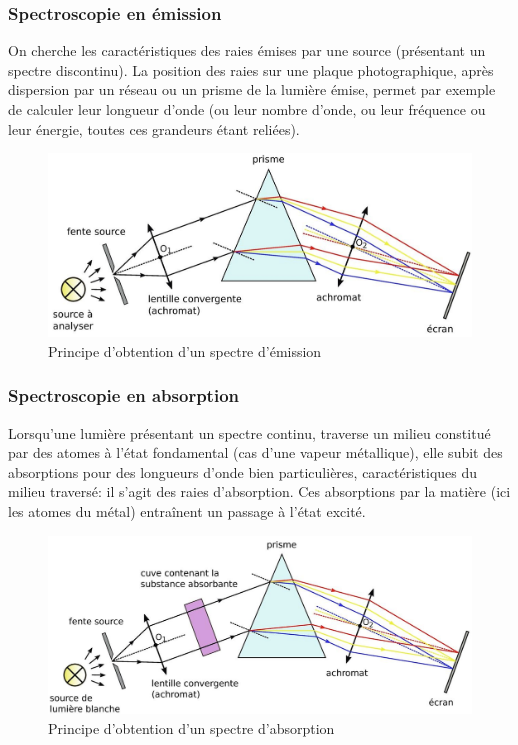 \documentclass{article}
\begin{document}
\subsubsection{Spectroscopie en émission}
On cherche les caractéristiques des raies émises par une source (présentant un spectre discontinu). La position des raies sur une plaque photographique, après dispersion par un réseau ou un prisme de la lumière émise, permet par exemple de calculer leur longueur d'onde (ou leur nombre d'onde, ou leur fréquence ou leur énergie, toutes ces grandeurs étant reliées).
\begin{figure}[ht]
    \centering
    \includegraphics[width=0.75\linewidth]{Fig/Spectro-emission.png}
    \caption{Principe d'obtention d'un spectre d'émission}
    \label{fig:emission}
\end{figure}

\subsubsection{Spectroscopie en absorption}
Lorsqu'une lumière présentant un spectre continu, traverse un milieu constitué par des atomes à l'état fondamental (cas d'une vapeur métallique), elle subit des absorptions pour des longueurs d'onde bien particulières, caractéristiques du milieu traversé: il s'agit des raies d'absorption. Ces absorptions par la matière (ici les atomes du métal) entraînent un passage à l'état excité.

\begin{figure}[ht]
    \centering
    \includegraphics[width=0.75\linewidth]{Fig/Spectro-absorption.png}
    \caption{Principe d'obtention d'un spectre d'absorption}
    \label{fig:absoption}
\end{figure}
\end{document}
